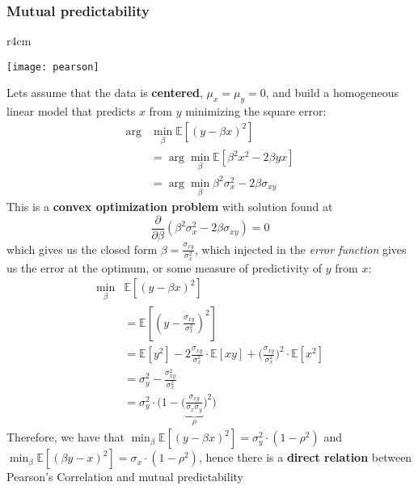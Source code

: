 \subsubsection{Mutual predictability}
\begin{wrapfigure}[5]{r}{4cm}
	\vspace{-1.5cm}
	\begin{center}
		\texttt{[image: pearson]}
	\end{center}
\end{wrapfigure}
Lets assume that the data is \textbf{centered}, $\mu_x = \mu_y = 0$, and build a homogeneous linear model that predicts $x$ from $y$ minimizing the square error:
\begin{align*}
	\arg &\min_\beta \mathbb{E}[(y-\beta x)^2]\\
	& = \arg\min_\beta \mathbb{E}[\beta^2x^2 - 2\beta yx]\\
	& = \arg\min_\beta \beta^2\sigma^2_x - 2\beta\sigma_{xy}
\end{align*}
This is a \textbf{convex optimization problem} with solution found at
\begin{equation*}
	\frac{\partial}{\partial\beta}(\beta^2\sigma^2_x - 2\beta\sigma_{xy})=0
\end{equation*}
which gives us the closed form $\beta = \frac{\sigma_{xy}}{\sigma^2_x}$, which injected in the \textit{error function} gives us the error at the optimum, or some measure of predictivity of $y$ from $x$:
\begin{align*}
	\min_\beta & \mathbb{E}[(y - \beta x)^2]\\
	& = \mathbb{E}[(y-\frac{\sigma_{xy}}{\sigma^2_x})^2]\\
	& = \mathbb{E}[y^2] - 2\frac{\sigma_{xy}}{\sigma^2_x} \cdot \mathbb{E}[xy] + \bigg(\frac{\sigma_{xy}}{\sigma^2_x}\bigg)^2 \cdot \mathbb{E}[x^2]\\
	& = \sigma_y ^ 2 - \frac{\sigma_{xy}^2}{\sigma^2_x}\\
	& = \sigma_y ^ 2 \cdot \bigg(1-\bigg(\underbrace{\frac{\sigma_{xy}}{\sigma_x\sigma_y}}_\rho\bigg)^2\bigg)
\end{align*}
Therefore, we have that $\min_\beta \mathbb{E}[(y - \beta x)^2] = \sigma_y^2\cdot (1-\rho^2)$ and $\min_\beta \mathbb{E}[(\beta y - x)^2] = \sigma_x \cdot (1-\rho^2)$, hence there is a \textbf{direct relation} between Pearson's Correlation and mutual predictability

\newpage
